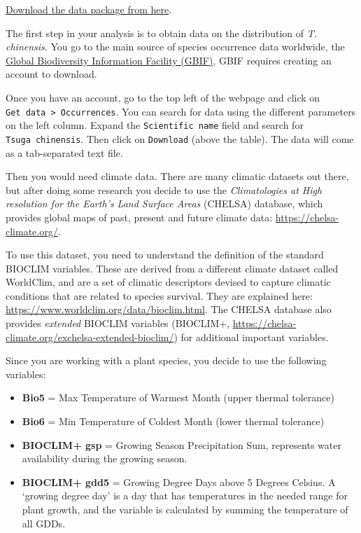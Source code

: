 \documentclass[
  letterpaper,
  DIV=11,
  numbers=noendperiod]{scrreprt}
\begin{document}
\href{https://stir-my.sharepoint.com/:u:/g/personal/ala2_stir_ac_uk/EdX5iTojX65Mv3Jf_DD-PvEBGKnlQIuu7Njo5XFdu4SQmA?e=krTy3W}{Download
the data package from here}.

The first step in your analysis is to obtain data on the distribution of
\emph{T. chinensis}. You go to the main source of species occurrence
data worldwide, the \href{https://www.gbif.org/}{Global Biodiversity
Information Facility (GBIF)}. GBIF requires creating an account to
download.

Once you have an account, go to the top left of the webpage and click on
\texttt{Get\ data\ \textgreater{}\ Occurrences}. You can search for data
using the different parameters on the left column. Expand the
\texttt{Scientific\ name} field and search for
\texttt{Tsuga\ chinensis}. Then click on \texttt{Download} (above the
table). The data will come as a tab-separated text file.

Then you would need climate data. There are many climatic datasets out
there, but after doing some research you decide to use the
\emph{Climatologies at High resolution for the Earth's Land Surface
Areas} (CHELSA) database, which provides global maps of past, present
and future climate data: \url{https://chelsa-climate.org/}.

To use this dataset, you need to understand the definition of the
standard BIOCLIM variables. These are derived from a different climate
dataset called WorldClim, and are a set of climatic descriptors devised
to capture climatic conditions that are related to species survival.
They are explained here:
\url{https://www.worldclim.org/data/bioclim.html}. The CHELSA database
also provides \emph{extended} BIOCLIM variables (BIOCLIM+,
\url{https://chelsa-climate.org/exchelsa-extended-bioclim/}) for
additional important variables.

Since you are working with a plant species, you decide to use the
following variables:

\begin{itemize}
\item
  \textbf{Bio5} = Max Temperature of Warmest Month (upper thermal
  tolerance)
\item
  \textbf{Bio6} = Min Temperature of Coldest Month (lower thermal
  tolerance)
\item
  \textbf{BIOCLIM+ gsp} = Growing Season Precipitation Sum, represents
  water availability during the growing season.
\item
  \textbf{BIOCLIM+ gdd5} = Growing Degree Days above 5 Degrees Celsius.
  A `growing degree day' is a day that has temperatures in the needed
  range for plant growth, and the variable is calculated by summing the
  temperature of all GDDs.
\end{itemize}
\end{document}
